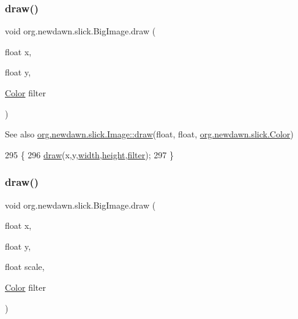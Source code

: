 \subsubsection{\texorpdfstring{draw()}{draw()}\hspace{0.1cm}{\footnotesize\ttfamily [2/10]}}
{\footnotesize\ttfamily void org.\+newdawn.\+slick.\+Big\+Image.\+draw (\begin{DoxyParamCaption}\item[{float}]{x,  }\item[{float}]{y,  }\item[{\mbox{\hyperlink{classorg_1_1newdawn_1_1slick_1_1_color}{Color}}}]{filter }\end{DoxyParamCaption})\hspace{0.3cm}{\ttfamily [inline]}}

\begin{DoxySeeAlso}{See also}
\mbox{\hyperlink{classorg_1_1newdawn_1_1slick_1_1_image_a9bddcca05c7140ab45df8ac5b250b6cd}{org.\+newdawn.\+slick.\+Image\+::draw}}(float, float, \mbox{\hyperlink{classorg_1_1newdawn_1_1slick_1_1_color}{org.\+newdawn.\+slick.\+Color}}) 
\end{DoxySeeAlso}

\begin{DoxyCode}
295                                                      \{
296         \mbox{\hyperlink{classorg_1_1newdawn_1_1slick_1_1_big_image_a75b5b008adf93b038aa56e9cfefd1a1c}{draw}}(x,y,\mbox{\hyperlink{classorg_1_1newdawn_1_1slick_1_1_image_a7d02c85e21b388428cfe5cc5c82714a1}{width}},\mbox{\hyperlink{classorg_1_1newdawn_1_1slick_1_1_image_a54397a37823bc59ddc79ec70dc5cf226}{height}},\mbox{\hyperlink{classorg_1_1newdawn_1_1slick_1_1_image_a1c6f09687817420f3762f32bb1c3ed76}{filter}});
297     \}
\end{DoxyCode}
\mbox{\label{classorg_1_1newdawn_1_1slick_1_1_big_image_a71cce2570f2cac6e4ba45ffd9715fed9}} 
\subsubsection{\texorpdfstring{draw()}{draw()}\hspace{0.1cm}{\footnotesize\ttfamily [3/10]}}
{\footnotesize\ttfamily void org.\+newdawn.\+slick.\+Big\+Image.\+draw (\begin{DoxyParamCaption}\item[{float}]{x,  }\item[{float}]{y,  }\item[{float}]{scale,  }\item[{\mbox{\hyperlink{classorg_1_1newdawn_1_1slick_1_1_color}{Color}}}]{filter }\end{DoxyParamCaption})\hspace{0.3cm}{\ttfamily [inline]}}


